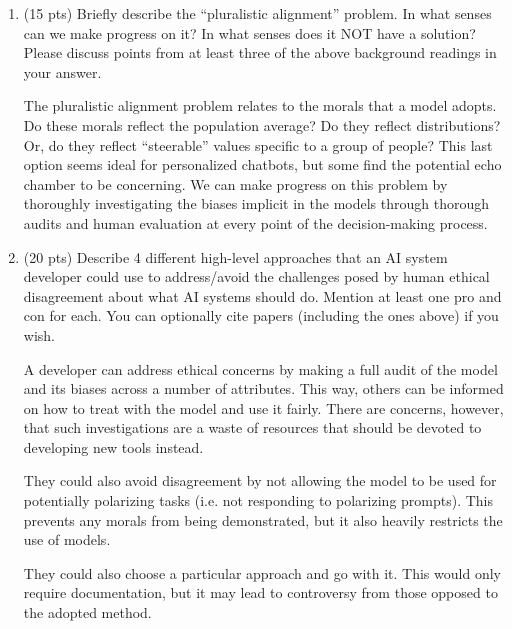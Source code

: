 \documentclass{article}
\begin{document}
\begin{enumerate}[label=(\alph*)]

    \item (15 pts) Briefly describe the ``pluralistic alignment'' problem. In what senses can we make progress on it? In what senses does it NOT have a solution? Please discuss points from at least three of the above background readings in your answer. 

    \bigskip
    
    \begin{mdframed}
        The pluralistic alignment problem relates to the morals that a model adopts. Do these morals reflect the population average? Do they reflect distributions? Or, do they reflect ``steerable'' values specific
        to a group of people? This last option seems ideal for personalized chatbots, but some find the potential echo chamber to be concerning. We can make progress on 
        this problem by thoroughly investigating the biases implicit in the models through thorough audits and human evaluation at every point of the decision-making process.
    \end{mdframed}
    
    \item (20 pts) Describe 4 different high-level approaches that an AI system developer could use to address/avoid the challenges posed by human ethical disagreement about what AI systems should do. Mention at least one pro and con for each. You can optionally cite papers (including the ones above) if you wish.

    \bigskip

    \begin{mdframed}
        A developer can address ethical concerns by making a full audit of the model and its biases across a number of attributes. This way, others can be informed on how to treat with the model and use it fairly. There are concerns, however, that such investigations are a 
        waste of resources that should be devoted to developing new tools instead. 

        They could also avoid disagreement by not allowing the model to be used for potentially polarizing tasks (i.e. not responding to polarizing prompts). This prevents any morals from being demonstrated, but it also heavily restricts the use of models.

        They could also choose a particular approach and go with it. This would only require documentation, but it may lead to controversy from those opposed to the adopted method.


\end{mdframed}
\end{enumerate}
\end{document}
